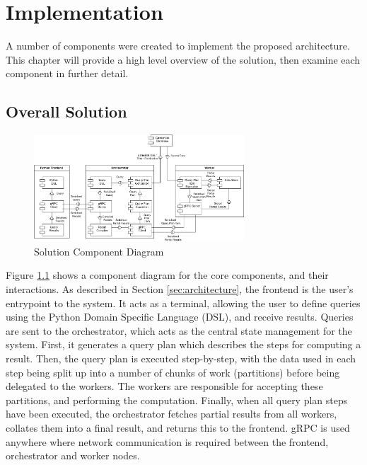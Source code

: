 \chapter{Implementation}\label{cha:implementation}

A number of components were created to implement the proposed architecture. This chapter will provide a high level overview of the solution, then examine each component in further detail.

\section{Overall Solution}
\begin{figure}[h]
	\centering
	\includegraphics[width=0.7\textwidth]{chapters/diagrams/implementation/component-architecture-diagram}
	\caption{Solution Component Diagram}
	\label{fig:component-architecture-diagram}
\end{figure}

Figure \ref{fig:component-architecture-diagram} shows a component diagram for the core components, and their interactions. As described in Section \ref{sec:architecture}, the frontend is the user's entrypoint to the system. It acts as a terminal, allowing the user to define queries using the Python Domain Specific Language (DSL), and receive results. Queries are sent to the orchestrator, which acts as the central state management for the system. First, it generates a query plan which describes the steps for computing a result. Then, the query plan is executed step-by-step, with the data used in each step being split up into a number of chunks of work (partitions) before being delegated to the workers. The workers are responsible for accepting these partitions, and performing the computation. Finally, when all query plan steps have been executed, the orchestrator fetches partial results from all workers, collates them into a final result, and returns this to the frontend. gRPC is used anywhere where network communication is required between the frontend, orchestrator and worker nodes.

